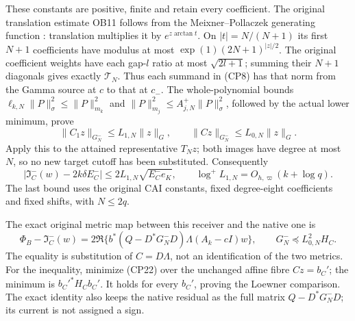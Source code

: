 \documentclass[11pt]{article}
\begin{document}
These constants are positive, finite and retain every coefficient.
The original translation estimate OB11 follows from the
Meixner--Pollaczek generating function \cite{CPDLMF18}: translation
multiplies it by $e^{z\arctan t}$. On $|t|=N/(N+1)$ its first
$N+1$ coefficients have modulus at most
$\exp(1)(2N+1)^{|z|/2}$. The original coefficient weights have each
gap-$l$ ratio at most $\sqrt{2l+1}$; summing their $N+1$ diagonals
gives exactly $\mathcal T_N$. Thus each summand in (CP8) has that
norm from the Gamma source at $c$ to that at $c_-$.
The whole-polynomial bounds
$\ell_{k,N}\|P\|_\sigma^2\le\|P\|_{m_k}^2$ and
$\|P\|_{m_j}^2\le A_{j,N}^+\|P\|_\sigma^2$, followed by the actual
lower minimum, prove
\begin{equation}\tag{CP22}
 \|C_1z\|_{G^-_N}\le L_{1,N}\|z\|_G,\qquad
 \|Cz\|_{G^-_N}\le L_{0,N}\|z\|_G.
\end{equation}
Apply this to the attained representative $T_Nz$; both images have
degree at most $N$, so no new target cutoff has been substituted.
Consequently
\begin{equation}\tag{CP23}
 |\mathfrak I_C^-(w)-2k\delta E_C^-|
 \le2L_{1,N}\sqrt{E_C^-e_K},\qquad
 \log^+L_{1,N}=O_{h,\varpi}(k+\log q).
\end{equation}
The last bound uses the original CAI constants, fixed degree-eight
coefficients and fixed shifts, with $N\le2q$.

The exact original metric map between this receiver and the native one is
\begin{equation}\tag{CP24}
 \Phi_B-\mathfrak I_C^-(w)
 =2\Re\{b^*(Q-D^*G^-_ND)\Lambda(A_k-cI)w\},
 \qquad G^-_N\preceq L_{0,N}^2H_C.
\end{equation}
The equality is substitution of $C=D\Lambda$, not an identification
of the two metrics. For the inequality, minimize (CP22) over the
unchanged affine fibre $Cz=b_C'$; the minimum is $b_C'^*H_Cb_C'$.
It holds for every $b_C'$, proving the Loewner comparison.
The exact identity also keeps the native residual as the full matrix
$Q-D^*G^-_ND$; its current is not assigned a sign.
\end{document}
